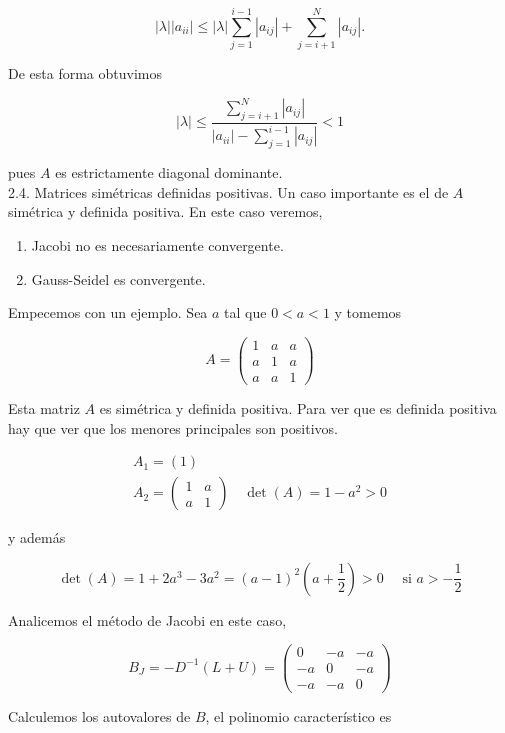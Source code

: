 \documentclass[10pt]{article}
\begin{document}
$$
|\lambda|\left|a_{i i}\right| \leq|\lambda| \sum_{j=1}^{i-1}\left|a_{i j}\right|+\sum_{j=i+1}^{N}\left|a_{i j}\right| .
$$

De esta forma obtuvimos

$$
|\lambda| \leq \frac{\sum_{j=i+1}^{N}\left|a_{i j}\right|}{\left|a_{i i}\right|-\sum_{j=1}^{i-1}\left|a_{i j}\right|}<1
$$

pues $A$ es estrictamente diagonal dominante.\\
2.4. Matrices simétricas definidas positivas. Un caso importante es el de $A$ simétrica y definida positiva. En este caso veremos,

\begin{enumerate}
  \item Jacobi no es necesariamente convergente.
  \item Gauss-Seidel es convergente.
\end{enumerate}

Empecemos con un ejemplo. Sea $a$ tal que $0<a<1$ y tomemos

$$
A=\left(\begin{array}{lll}
1 & a & a \\
a & 1 & a \\
a & a & 1
\end{array}\right)
$$

Esta matriz $A$ es simétrica y definida positiva. Para ver que es definida positiva hay que ver que los menores principales son positivos.

$$
\begin{gathered}
A_{1}=(1) \\
A_{2}=\left(\begin{array}{cc}
1 & a \\
a & 1
\end{array}\right) \quad \operatorname{det}(A)=1-a^{2}>0
\end{gathered}
$$

y además

$$
\operatorname{det}(A)=1+2 a^{3}-3 a^{2}=(a-1)^{2}\left(a+\frac{1}{2}\right)>0 \quad \text { si } a>-\frac{1}{2}
$$

Analicemos el método de Jacobi en este caso,

$$
B_{J}=-D^{-1}(L+U)=\left(\begin{array}{ccc}
0 & -a & -a \\
-a & 0 & -a \\
-a & -a & 0
\end{array}\right)
$$

Calculemos los autovalores de $B$, el polinomio característico es
\end{document}
